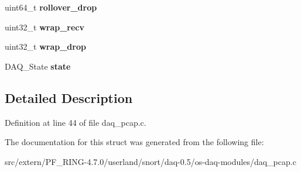 \begin{DoxyCompactItemize}
\item 
\hypertarget{struct__pcap__context_a96c2eb85e1753226fc80f4a7c9506193}{
uint64\_\-t {\bfseries rollover\_\-drop}}
\label{struct__pcap__context_a96c2eb85e1753226fc80f4a7c9506193}

\item 
\hypertarget{struct__pcap__context_abf20e77fba9b216c422cc25e98acdb4d}{
uint32\_\-t {\bfseries wrap\_\-recv}}
\label{struct__pcap__context_abf20e77fba9b216c422cc25e98acdb4d}

\item 
\hypertarget{struct__pcap__context_a5f137a034d2a2539eedf13311957cef4}{
uint32\_\-t {\bfseries wrap\_\-drop}}
\label{struct__pcap__context_a5f137a034d2a2539eedf13311957cef4}

\item 
\hypertarget{struct__pcap__context_a26cc13788480969583b55a56f086f928}{
DAQ\_\-State {\bfseries state}}
\label{struct__pcap__context_a26cc13788480969583b55a56f086f928}

\end{DoxyCompactItemize}


\subsection{Detailed Description}


Definition at line 44 of file daq\_\-pcap.c.



The documentation for this struct was generated from the following file:\begin{DoxyCompactItemize}
\item 
src/extern/PF\_\-RING-\/4.7.0/userland/snort/daq-\/0.5/os-\/daq-\/modules/daq\_\-pcap.c\end{DoxyCompactItemize}
